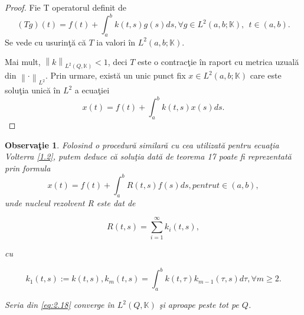 \documentclass[a4paper,12pt,oneside]{report}
\newtheorem{remark}{Observa\c{t}ie}
\begin{document}
\begin{proof}

Fie T operatorul definit de
\begin{displaymath}
\left ( Tg \right )\left ( t \right ) = f\left ( t \right ) + \int_{a}^{b}k\left ( t,s \right )g\left ( s \right )ds,
 \forall g\in L^{2}\left ( a,b;\mathbb{K} \right ), ~~t\in \left ( a,b \right ).
\end{displaymath}
\noindent Se vede cu usurin\c{t}\u{a} c\u{a}   \(T\) ia valori \^{i}n \(L^{2}\left ( a,b;\mathbb{K} \right )\).

Mai mult, \(\left \| k \right \|_{L^{2}\left ( Q, \mathbb{K} \right )}< 1\), deci \(T\) este o contrac\c{t}ie \^{i}n raport cu metrica uzual\u{a} din \(\left \| \cdot  \right \|_{L^{2}}\). Prin urmare, exist\u{a} un unic punct fix  \(x\in L^{2}\left ( a,b;\mathbb{K} \right )\) care este solu\c{t}ia unic\u{a} \^{i}n \(L^{2}\) a ecua\c{t}iei
\begin{displaymath}
x\left ( t \right ) = f\left ( t \right ) + \int_{a}^{b}k\left ( t,s \right )x\left ( s \right )ds.
\end{displaymath}
\end{proof}

\begin{remark}
Folosind o procedur\u{a} similar\u{a} cu cea utilizat\u{a} pentru ecua\c{t}ia Volterra \ref{1.2}, putem deduce c\u{a} solu\c{t}ia dat\u{a} de teorema 17 poate fi reprezentat\u{a} prin formula
\begin{displaymath}
x\left ( t \right ) = f\left ( t \right ) + \int_{a}^{b}R\left ( t,s \right )f\left ( s \right )ds, pentru t\in \left ( a,b \right ),
\end{displaymath}
unde nucleul rezolvent R este dat de

\begin{displaymath}
R\left ( t,s \right ) = \sum_{i=1}^{\infty }k_{i}\left ( t,s \right ), \label{eq:2.18} \tag{2.18}
\end{displaymath}

\noindent cu

\begin{displaymath}
k_{1}\left ( t,s \right ):= k\left ( t,s \right ), k_{m}\left ( t,s \right ) = \int_{a}^{b}k\left ( t,\tau  \right )k_{m -1}\left ( \tau ,s \right )d\tau , \forall m\geq 2.
\end{displaymath}

\noindent Seria din \ref{eq:2.18} converge \^{i}n \(L^{2}\left ( Q,\mathbb{K} \right )\) \c{s}i aproape peste tot pe \(Q\).

\end{remark}					
\end{document}
